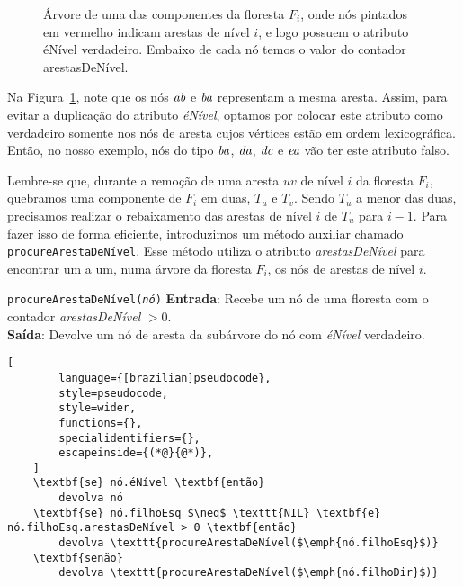 \begin{figure}[H]
    \caption{Árvore de uma das componentes da floresta $F_i$, onde nós pintados em vermelho indicam arestas de nível $i$, e logo possuem o atributo éNível verdadeiro. Embaixo de cada nó temos o valor do contador arestasDeNível.}
    \label{fig:euler-tour-balanced-tree-is-level-propagation}
\end{figure}

Na Figura~\ref{fig:euler-tour-balanced-tree-is-level-propagation}, note que os nós $\emph{ab}$ e $\emph{ba}$ representam a mesma aresta. Assim, para evitar a duplicação do atributo \textit{éNível}, optamos por colocar este atributo como verdadeiro somente nos nós de aresta cujos vértices estão em ordem lexicográfica. Então, no nosso exemplo, nós do tipo $\emph{ba}$, $\emph{da}$, $\emph{dc}$ e $\emph{ea}$ vão ter este atributo falso. 

Lembre-se que, durante a remoção de uma aresta $uv$ de nível $i$ da floresta $F_i$, quebramos uma componente de $F_i$ em duas, $T_u$ e $T_v$. Sendo $T_u$ a menor das duas, precisamos realizar o rebaixamento das arestas de nível $i$ de $T_u$ para $i-1$. Para fazer isso de forma eficiente, introduzimos um método auxiliar chamado \texttt{procureArestaDeNível}. Esse método utiliza o atributo \textit{arestasDeNível} para encontrar um a um, numa árvore da floresta $F_i$, os nós de arestas de nível $i$.

\begin{programruledcaption}{\texttt{procureArestaDeNível(\textit{nó})} \label{prog:findEdgesIsLevel-GD}}
    \noindent\textbf{Entrada}: Recebe um nó de uma floresta com o contador \textit{arestasDeNível} $> 0$.
    \\
    \noindent\textbf{Saída}: Devolve um nó de aresta da subárvore do nó com \textit{éNível} verdadeiro.
    \vspace{-0.5\baselineskip}
    \begin{lstlisting}[
        language={[brazilian]pseudocode},
        style=pseudocode,
        style=wider,
        functions={},
        specialidentifiers={},
        escapeinside={(*@}{@*)},
    ]
    \textbf{se} nó.éNível \textbf{então}
        devolva nó
    \textbf{se} nó.filhoEsq $\neq$ \texttt{NIL} \textbf{e} nó.filhoEsq.arestasDeNível > 0 \textbf{então}
        devolva \texttt{procureArestaDeNível($\emph{nó.filhoEsq}$)}
    \textbf{senão}
        devolva \texttt{procureArestaDeNível($\emph{nó.filhoDir}$)}
\end{lstlisting}
\vspace{-0.5\baselineskip}
\end{programruledcaption}

